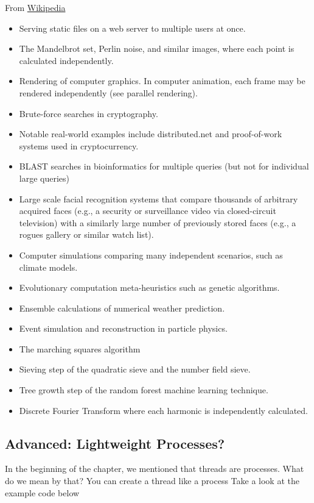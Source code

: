 From \href{https://en.wikipedia.org/wiki/Embarrassingly_parallel}{Wikipedia}
\begin{itemize}
\tightlist
\item Serving static files on a web server to multiple users at once.
\item The Mandelbrot set, Perlin noise, and similar images, where each point is calculated independently.
\item Rendering of computer graphics. In computer animation, each frame may be rendered independently (see parallel rendering).
\item Brute-force searches in cryptography.
\item Notable real-world examples include distributed.net and proof-of-work systems used in cryptocurrency.
\item BLAST searches in bioinformatics for multiple queries (but not for individual large queries)
\item Large scale facial recognition systems that compare thousands of arbitrary acquired faces (e.g., a security or surveillance video via closed-circuit television) with a similarly large number of previously stored faces (e.g., a rogues gallery or similar watch list).
\item Computer simulations comparing many independent scenarios, such as climate models.
\item Evolutionary computation meta-heuristics such as genetic algorithms.
\item Ensemble calculations of numerical weather prediction.
\item Event simulation and reconstruction in particle physics.
\item The marching squares algorithm
\item Sieving step of the quadratic sieve and the number field sieve.
\item Tree growth step of the random forest machine learning technique.
\item Discrete Fourier Transform where each harmonic is independently calculated.
\end{itemize}

\subsection{Advanced: Lightweight Processes?}

In the beginning of the chapter, we mentioned that threads are processes.
What do we mean by that?
You can create a thread like a process
Take a look at the example code below


